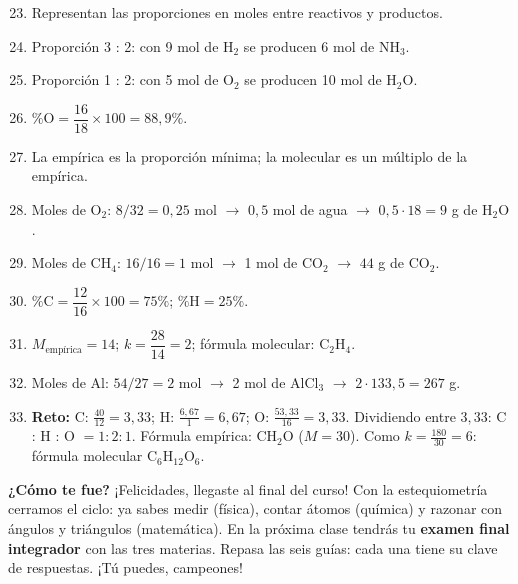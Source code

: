 \documentclass[12pt, letterpaper]{article}
\begin{document}
  \begin{enumerate}[leftmargin=*, label=\textbf{\arabic*.}]
    \setcounter{enumi}{22}
    \item Representan las proporciones en moles entre reactivos y productos.
    \item Proporción 3 : 2: con 9 mol de $\text{H}_2$ se producen 6 mol de $\text{NH}_3$.
    \item Proporción 1 : 2: con 5 mol de $\text{O}_2$ se producen 10 mol de $\text{H}_2\text{O}$.
    \item $\% \text{O} = \dfrac{16}{18} \times 100 = 88{,}9\%$.
    \item La empírica es la proporción mínima; la molecular es un múltiplo de la empírica.
    \item Moles de $\text{O}_2$: $8/32 = 0{,}25$ mol $\rightarrow$ $0{,}5$ mol de agua $\rightarrow$ $0{,}5 \cdot 18 = 9$ g de $\text{H}_2\text{O}$.
    \item Moles de $\text{CH}_4$: $16/16 = 1$ mol $\rightarrow$ 1 mol de $\text{CO}_2$ $\rightarrow$ $44$ g de $\text{CO}_2$.
    \item $\% \text{C} = \dfrac{12}{16} \times 100 = 75\%$; $\% \text{H} = 25\%$.
    \item $M_{\text{empírica}} = 14$; $k = \dfrac{28}{14} = 2$; fórmula molecular: $\text{C}_2\text{H}_4$.
    \item Moles de Al: $54/27 = 2$ mol $\rightarrow$ 2 mol de $\text{AlCl}_3$ $\rightarrow$ $2 \cdot 133{,}5 = 267$ g.
    \item \textbf{Reto:} $\text{C}$: $\frac{40}{12} = 3{,}33$; $\text{H}$: $\frac{6{,}67}{1} = 6{,}67$; $\text{O}$: $\frac{53{,}33}{16} = 3{,}33$. Dividiendo entre $3{,}33$: C : H : O $= 1 : 2 : 1$. Fórmula empírica: $\text{CH}_2\text{O}$ ($M = 30$). Como $k = \frac{180}{30} = 6$: fórmula molecular $\text{C}_6\text{H}_{12}\text{O}_6$.
  \end{enumerate}

  \vspace{8pt}
  \begin{cuadroinfo}
    \small
    \textbf{¿Cómo te fue?} ¡Felicidades, llegaste al final del curso! Con la estequiometría cerramos el ciclo: ya sabes medir (física), contar átomos (química) y razonar con ángulos y triángulos (matemática). En la próxima clase tendrás tu \textbf{examen final integrador} con las tres materias. Repasa las seis guías: cada una tiene su clave de respuestas. ¡Tú puedes, campeones!
  \end{cuadroinfo}

\fi
\end{document}
